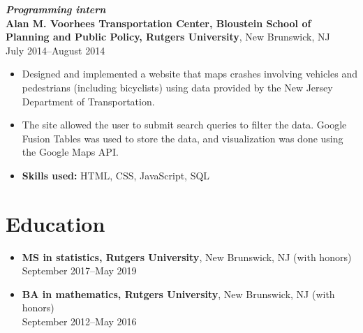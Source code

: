 \documentclass[letterpaper,12pt]{article}
\begin{document}
\textit{\textbf{Programming intern}} \\
\textbf{Alan M. Voorhees Transportation Center, Bloustein School of
  Planning and Public Policy, Rutgers University},
New Brunswick, NJ \\
July 2014--August 2014
\begin{itemize}
\item Designed and implemented a website that maps crashes involving
  vehicles and pedestrians (including bicyclists) using data provided
  by the New Jersey Department of Transportation.
\item The site allowed the user to submit search queries to filter the
  data. Google Fusion Tables was used to store the data, and
  visualization was done using the Google Maps API.
\item \textbf{Skills used:} HTML, CSS, JavaScript, SQL
\end{itemize}
\fi

\section*{Education}

\begin{itemize}
\item \textbf{MS in statistics, Rutgers University}, New Brunswick, NJ
  (with honors) \\
  September 2017--May 2019

\item \textbf{BA in mathematics, Rutgers University}, New Brunswick, NJ
  (with honors) \\
  September 2012--May 2016
\end{itemize}
\end{document}
